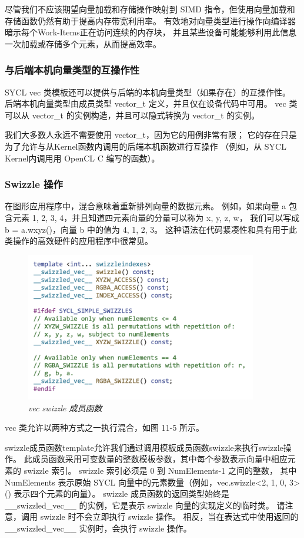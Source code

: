 尽管我们不应该期望向量加载和存储操作映射到 SIMD 指令，但使用向量加载和存储函数仍然有助于提高内存带宽利用率。 
有效地对向量类型进行操作向编译器暗示每个Work-Items正在访问连续的内存块，
并且某些设备可能能够利用此信息一次加载或存储多个元素，从而提高效率。

\subsubsection{与后端本机向量类型的互操作性}
SYCL vec 类模板还可以提供与后端的本机向量类型（如果存在）的互操作性。 
后端本机向量类型由成员类型 vector\_t 定义，并且仅在设备代码中可用。 
vec 类可以从 vector\_t 的实例构造，并且可以隐式转换为 vector\_t 的实例。

我们大多数人永远不需要使用 vector\_t，因为它的用例非常有限； 
它的存在只是为了允许与从Kernel函数内调用的后端本机函数进行互操作
（例如，从 SYCL Kernel内调用用 OpenCL C 编写的函数）。

\subsubsection{Swizzle 操作}
在图形应用程序中，混合意味着重新排列向量的数据元素。 
例如，如果向量 a 包含元素 {1, 2, 3, 4}，并且知道四元素向量的分量可以称为 {x, y, z, w}，
我们可以写成 b = a.wxyz()，向量 b 中的值为 {4, 1, 2, 3}。 
这种语法在代码紧凑性和具有用于此类操作的高效硬件的应用程序中很常见。

\begin{figure}[H]
	\centering
	\includegraphics[width=0.9\textwidth]{figs/F11.5.png}
	\caption{\textit{vec swizzle 成员函数 }}
\end{figure}

vec 类允许以两种方式之一执行混合，如图 11-5 所示。

swizzle成员函数template允许我们通过调用模板成员函数swizzle来执行swizzle操作。 
此成员函数采用可变数量的整数模板参数，其中每个参数表示向量中相应元素的 swizzle 索引。 
swizzle 索引必须是 0 到 NumElements-1 之间的整数，
其中 NumElements 表示原始 SYCL 向量中的元素数量（例如，vec.swizzle<2, 1, 0, 3>() 表示四个元素的向量）。 
swizzle 成员函数的返回类型始终是 \_\_swizzled\_vec\_\_ 的实例，它是表示 swizzle 向量的实现定义的临时类。 
请注意，调用 swizzle 时不会立即执行 swizzle 操作。 
相反，当在表达式中使用返回的 \_\_swizzled\_vec\_\_ 实例时，会执行 swizzle 操作。

